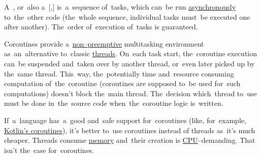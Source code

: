 \label{coroutines}
A~, or~also a~[,] is~a~sequence of~tasks, which can~be run \hyperref[concurrentparallelasynchronous]{asynchronously} to~the~other code (the~whole sequence, individual tasks must~be executed one after another).
The~order of~execution of~tasks is guaranteed.

Coroutines provide a~\hyperref[preemption]{non--preemptive} multitasking environment as~an~alternative to~classic \hyperref[multithreading]{threads}.
On~each task start, the~coroutine execution can~be suspended and~taken over by another thread, or~even later picked up by the~same thread.
This~way, the~potentially time and~resource consuming computation of~the~coroutine (coroutines are supposed to~be used for~such computations) doesn't block the~main thread.
The~decision which~thread to~use must be done in~the~source code when~the~coroutine logic \mbox{is written.}

If~a~language has~a~good and~safe support for~coroutines (like, for~example, \hyperref[kotlincoroutine]{Kotlin's coroutines}), it's better to~use coroutines instead of threads as~it's much cheaper.
Threads consume \hyperref[systemmemory]{memory} and~their creation is \hyperref[processorcpucore]{CPU}--demanding.
That isn't the~case for~coroutines.
